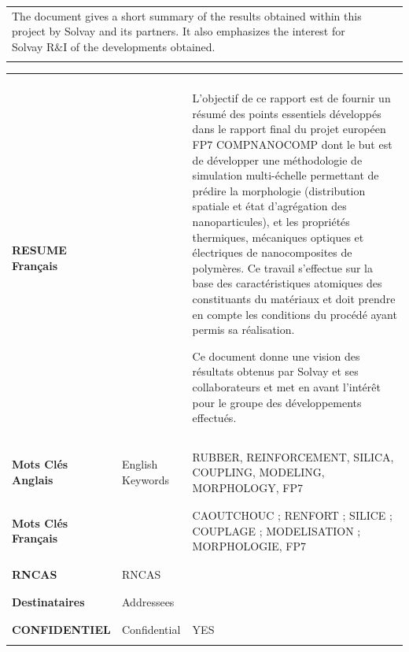\documentclass[10pt, letter]{article}
\renewcommand{\=}{\, =\, }
\newcommand{\+}{\, +\, }
\renewcommand{\-}{\, -\, }
\begin{document}
\begin{flushleft}
\begin{tabular}{|l|p{}|p{}|}
The document gives a short summary of the results obtained within this project by Solvay and its partners. It also emphasizes the interest for Solvay R$\&$I of  the developments obtained. 


\\
&&\\ 
\hline
\end{tabular}

\begin{tabular}{|l|p{}|p{}|}
\hline
&&\\
\bf RESUME Français &&  L'objectif de ce rapport est de fournir un résumé des points essentiels développés dans le rapport final du projet européen FP7 COMPNANOCOMP dont le but est de développer une méthodologie de simulation multi-échelle permettant de prédire la morphologie (distribution spatiale et état d'agrégation des nanoparticules), et les propriétés thermiques, mécaniques optiques et électriques de nanocomposites de polymères. Ce travail s'effectue sur la base des caractéristiques atomiques des constituants du matériaux et doit prendre en compte les conditions du procédé ayant permis sa réalisation.

Ce document donne une vision des résultats obtenus par Solvay et ses collaborateurs et met en avant l'intérêt pour le groupe des développements effectués.
\\
&&\\ \hline &&\\
\bf Mots Clés Anglais & English Keywords&  RUBBER, REINFORCEMENT, SILICA, COUPLING, MODELING, MORPHOLOGY, FP7\\
&&\\ \hline &&\\
\bf Mots Clés Français &&  CAOUTCHOUC ; RENFORT ; SILICE ; COUPLAGE ; MODELISATION ; MORPHOLOGIE, FP7\\
&&\\ \hline &&\\
\bf RNCAS & RNCAS & \\
&&\\ \hline &&\\
\bf Destinataires& Addressees & \\
&&\\ \hline &&\\
\bf CONFIDENTIEL & Confidential & YES \\
&&\\ \hline
\end{tabular}



\end{flushleft}
\end{document}
